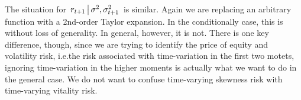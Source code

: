 \documentclass[11pt, letterpaper, twoside, final]{article}
\begin{document}
The situation for $\left. r_{t+1} \,\middle\vert\, \sigma^2, \sigma^2_{t+1} \right.$ is similar.
Again we are replacing an arbitrary function with a 2nd-order Taylor expansion.
In the conditionally case, this is without loss of generality.
In general, however, it is not.
There is one key difference, though, since we are trying to identify the price of equity and volatility risk,
i.e.\@ the risk associated with time-variation in the first two motets, ignoring time-variation in the higher
moments is actually what we want to do in the general case.
We do not want to confuse time-varying skewness risk with time-varying vitality risk.
\end{document}
